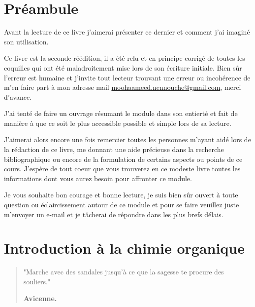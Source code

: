 \documentclass[a4paper, oneside]{book}
\begin{document}
\part*{Préambule}
\label{Préambule}
\vspace*{8cm}
\thispagestyle{empty}
\begin{large}
Avant la lecture de ce livre j'aimerai présenter ce dernier et comment j'ai imaginé son utilisation. 

Ce livre est la seconde réédition, il a été relu et en principe corrigé de toutes les coquilles qui ont été maladroitement mise lors de son écriture initiale. Bien sûr l'erreur est humaine et j'invite tout lecteur trouvant une erreur ou incohérence de m'en faire part à mon adresse mail \href{mailto://moohaameed.nennouche@gmail.com}{moohaameed.nennouche@gmail.com}, merci d'avance. 

J'ai tenté de faire un ouvrage résumant le module dans son entierté et fait de manière à que ce soit le plus accessible possible et simple lors de sa lecture. 

J'aimerai alors encore une fois remercier toutes les personnes m'ayant aidé lors de la rédaction de ce livre, me donnant une aide précieuse dans la recherche bibliographique ou encore de la formulation de certains aspects ou points de ce cours. J'espère de tout coeur que vous trouverez en ce modeste livre toutes les informations dont vous aurez besoin pour affronter ce module. 

Je vous souhaite bon courage et bonne lecture, je suis bien sûr ouvert à toute question ou éclaircissement autour de ce module et pour se faire veuillez juste m'envoyer un e-mail et je tâcherai de répondre dans les plus brefs délais. 
\end{large}
\fancyfoot[R]{\textbf{\leftmark}}
\part{Introduction à la chimie organique}
\begin{quotation}
    \vspace*{\fill}
    \LARGE{"Marche avec des sandales jusqu'à ce que la sagesse te procure des souliers."\\
    \begin{center}
        \textbf{Avicenne.}
    \end{center}}
\end{quotation}
\vspace*{\fill}
\newpage
\vspace*{\fill}
\end{document}
